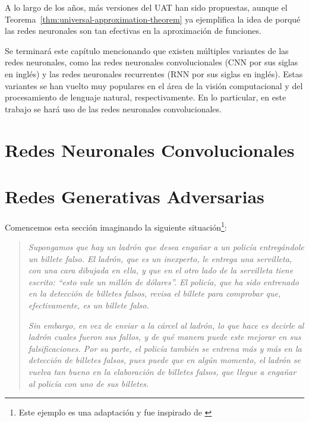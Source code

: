 {{    A lo largo de los años, más versiones del UAT han sido propuestas, aunque el Teorema~\ref{thm:universal-approximation-theorem} ya ejemplifica la idea de porqué las redes neuronales son tan efectivas en la aproximación de funciones.

    Se terminará este capítulo mencionando que existen múltiples variantes de las redes neuronales, como las redes neuronales convolucionales (CNN por sus siglas en inglés) y las redes neuronales recurrentes (RNN por sus siglas en inglés). Estas variantes se han vuelto muy populares en el área de la visión computacional y del procesamiento de lenguaje natural, respectivamente. En lo particular, en este trabajo se hará uso   de las redes neuronales convolucionales.




}  %


\section{Redes Neuronales Convolucionales}\label{sec:redes-neuronales-convolucionales}
{
}  %


\section{Redes Generativas Adversarias}\label{sec:redes-generativas-adversarias-GAN}
{
Comencemos esta sección imaginando la siguiente situación\footnote{Este ejemplo es una adaptación y fue inspirado de \cite[min. 4:32]{santana2017creando}}:
\begin{quotation}
    \textit{Supongamos que hay un ladrón que desea engañar a un policía entregándole un billete falso. El ladrón, que es un inexperto, le entrega una servilleta, con una cara dibujada en ella, y que en el otro lado de la servilleta tiene escrito: ``\emph{esto vale un millón de dólares}''. El policía, que ha sido entrenado en la detección de billetes falsos, revisa el billete para comprobar que, efectivamente, es un billete falso.}

    \textit{Sin embargo, en vez de enviar a la cárcel al ladrón, lo que hace es decirle al ladrón cuales fueron sus fallos, y de qué manera puede este mejorar en sus falsificaciones. Por su parte, el policía también se entrena más y más en la detección de billetes falsos, pues puede que en algún momento, el ladrón se vuelva tan bueno en la elaboración de billetes falsos, que llegue a engañar al policía con uno de sus billetes.}
\end{quotation}

}}

